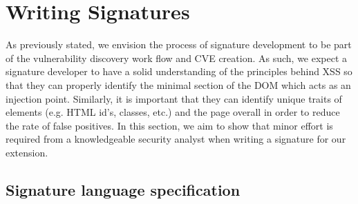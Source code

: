 \section{Writing Signatures}

As previously stated, we envision the process of signature development to be part of the vulnerability discovery work flow and CVE creation. As such, we expect a signature developer to have a solid understanding of the principles behind XSS so that they can properly identify the minimal section of the DOM which acts as an injection point. Similarly, it is important that they can identify unique traits of elements (e.g. HTML id's, classes, etc.) and the page overall in order to reduce the rate of false positives. In this section, we aim to show that minor effort is required from a knowledgeable security analyst when writing a signature for our extension.

\subsection{Signature language specification} 

